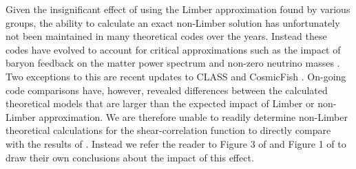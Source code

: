 Given the insignificant effect of using the Limber approximation found by various groups, the ability to calculate an exact non-Limber solution has unfortunately not been maintained in many theoretical codes over the years.  Instead these codes have evolved to account for critical approximations such as the impact of baryon feedback on the matter power spectrum and non-zero neutrino masses \citep[see for example][]{joudaki/etal:2016, mead/etal:2016}.    Two exceptions to this are recent updates to CLASS \citep{blas/lesgourgues/tram:2011,audren/etal:2013} and CosmicFish \citep{raveri/etal:2016}.  On-going code comparisons have, however, revealed differences between the calculated theoretical models that are larger than the expected impact of Limber or non-Limber approximation.   We are therefore unable to readily determine non-Limber theoretical calculations for the shear-correlation function to directly compare with the results of \citet{kitching/etal:2016}.   Instead we refer the reader to Figure 3 of \citet{giannantonio/etal:2012} and Figure 1 of  \citet{bernardeau/etal:2012} to draw their own conclusions about the impact of this effect.



 
 
 
 
 
 
 